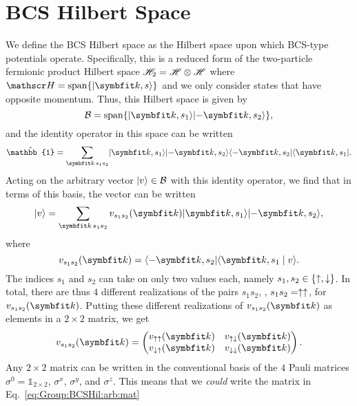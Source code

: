 \section{BCS Hilbert Space}
\label{sec:Group:BCSHil}
We define the BCS Hilbert space as the Hilbert space upon which BCS-type potentials operate. Specifically, this is a reduced form of the two-particle
fermionic product Hilbert space $\mathscr{H}_2 = \mathscr{H}\otimes\mathscr{H}$ where $\hil = \Span\{\ket{\v{k},s}\}$ and we only consider states that have opposite momentum.
Thus, this Hilbert space is given by 
\begin{equation}
    \label{eq:Group:BCSHil:space}
    \mathcal{B} = \Span\{\ket{\v{k},s_1}\ket{-\v{k},s_2}\},
\end{equation}
and the identity operator in this space can be written
\begin{equation}
    \label{eq:Group:BCSHil:id}
    \hat{\mathbb{1}} = \sum_{\v{k}\,s_1s_2}\ket{\v{k},s_1}\ket{-\v{k},s_2}\bra{-\v{k},s_2}\bra{\v{k},s_1}.
\end{equation}
Acting on the arbitrary vector $\lvert v \rangle\in\mathcal{B}$ with this identity operator, we find that in terms of this basis, the vector can be written
\begin{equation}
    \label{eq:Group:BCSHil:arbitrary}
    \ket{v} = \sum_{\v{k}\,s_1s_2}v_{s_1s_2}(\v{k})\ket{\v{k},s_1}\ket{-\v{k},s_2},
\end{equation}
where
\begin{equation}
    \label{eq:Group:BCSHil:arbitrary:coeff}
    v_{s_1s_2}(\v{k}) = \bra{-\v{k},s_2}\braket{\v{k},s_1}{v}.
\end{equation}
The indices $s_1$ and $s_2$ can take on only two values each, namely $s_1,s_2\in\{\uparrow,\downarrow\}$. In total, there are thus $4$ different realizations
of the pairs $s_1s_2$, \eg, $s_1s_2=\uparrow\uparrow$, for $v_{s_1s_2}(\v{k})$. Putting these different realizations of $v_{s_1s_2}(\v{k})$ as elements in a $2\times2$ matrix,
we get
\begin{equation}
    \label{eq:Group:BCSHil:arb:mat}
    v_{s_1s_2}(\v{k}) =
    \begin{pmatrix}
        v_{\up\up}(\v{k}) & v_{\up\dn}(\v{k})\\
        v_{\dn\up}(\v{k}) & v_{\dn\dn}(\v{k})
    \end{pmatrix}.
\end{equation}
Any $2\times 2$ matrix can be written in the conventional basis of the $4$ Pauli matrices $\sigma^0 = \mathbb{1}_{2\times 2}$, $\sigma^x$, $\sigma^y$,
and $\sigma^z$. This means that we \emph{could} write the matrix in Eq.~\eqref{eq:Group:BCSHil:arb:mat}
